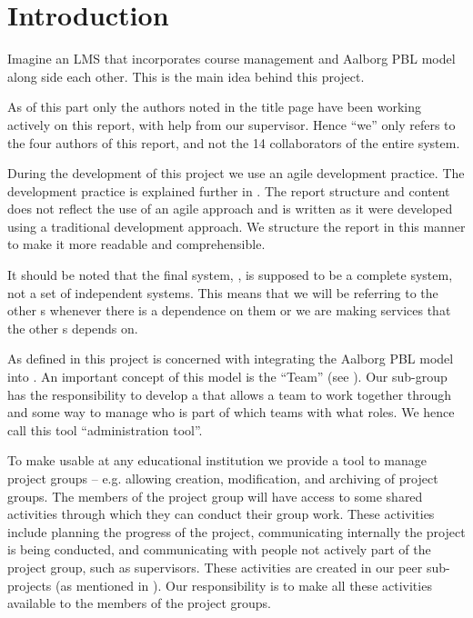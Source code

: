 \chapter{Introduction}
\label{chap:introProjectgroup}
Imagine an LMS that incorporates course management and Aalborg PBL model along side each other.
This is the main idea behind this project.

As of this part only the authors noted in the title page have been working actively on this report, with help from our supervisor.
Hence ``we'' only refers to the four authors of this report, and not the 14 collaborators of the entire system.

During the development of this project we use an agile development practice. 
The development practice is explained further in . 
The report structure and content does not reflect the use of an agile approach and is written as it were developed using a traditional development approach. 
We structure the report in this manner to make it more readable and comprehensible. 

It should be noted that the final system, \system{}, is supposed to be a complete system, not a set of independent systems.
This means that we will be referring to the other \subsystem{}s whenever there is a dependence on them or we are making services that the other \subsystem{}s depends on.



As defined in  this project is concerned with integrating the Aalborg PBL model into \moodle.
An important concept of this model is the ``Team'' (see ).
Our sub-group has the responsibility to develop a \subsystem{} that allows a team to work together through \moodle{} and some way to manage who is part of which teams with what roles. We hence call this tool ``administration tool''.






To make \system{} usable at any educational institution we provide a tool to manage project groups -- e.g. allowing creation, modification, and archiving of project groups.
The members of the project group will have access to some shared activities through which they can conduct their group work.
These activities include planning the progress of the project, communicating internally the project is being conducted, and communicating with people not actively part of the project group, such as supervisors.
These activities are created in our peer sub-projects (as mentioned in ).
Our responsibility is to make all these activities available to the members of the project groups.





